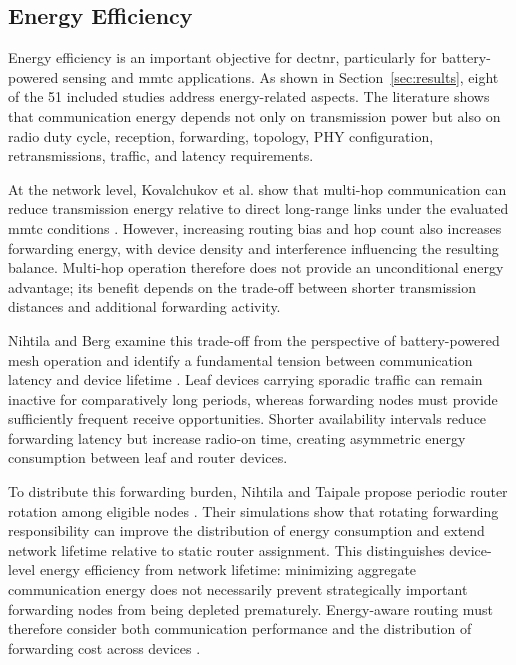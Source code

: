 \subsection{Energy Efficiency}
\label{subsec:energy}

Energy efficiency is an important objective for \gls{dectnr}, particularly for battery-powered sensing and \gls{mmtc} applications. As shown in Section~\ref{sec:results}, eight of the 51 included studies address energy-related aspects. The literature shows that communication energy depends not only on transmission power but also on radio duty cycle, reception, forwarding, topology, PHY configuration, retransmissions, traffic, and latency requirements.

At the network level, Kovalchukov et al. show that multi-hop communication can reduce transmission energy relative to direct long-range links under the evaluated \gls{mmtc} conditions \cite{kovalchukovDECT2020NewRadio2022}. However, increasing routing bias and hop count also increases forwarding energy, with device density and interference influencing the resulting balance. Multi-hop operation therefore does not provide an unconditional energy advantage; its benefit depends on the trade-off between shorter transmission distances and additional forwarding activity.

Nihtila and Berg examine this trade-off from the perspective of battery-powered mesh operation and identify a fundamental tension between communication latency and device lifetime \cite{nihtilaEnergyConsumptionDECT20202022}. Leaf devices carrying sporadic traffic can remain inactive for comparatively long periods, whereas forwarding nodes must provide sufficiently frequent receive opportunities. Shorter availability intervals reduce forwarding latency but increase radio-on time, creating asymmetric energy consumption between leaf and router devices.

To distribute this forwarding burden, Nihtila and Taipale propose periodic router rotation among eligible nodes \cite{nihtilaEnergySavingRouter2022}. Their simulations show that rotating forwarding responsibility can improve the distribution of energy consumption and extend network lifetime relative to static router assignment. This distinguishes device-level energy efficiency from network lifetime: minimizing aggregate communication energy does not necessarily prevent strategically important forwarding nodes from being depleted prematurely. Energy-aware routing must therefore consider both communication performance and the distribution of forwarding cost across devices \cite{nihtilaEnergyConsumptionDECT20202022, nihtilaEnergySavingRouter2022}.

